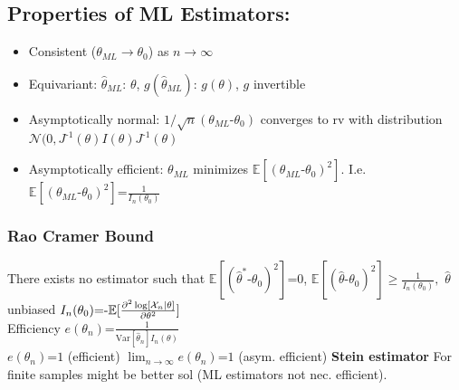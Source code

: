 \subsection{Properties of ML Estimators:}
\begin{itemize}
	\item Consistent ($\theta_{ML} \to \theta_0$) as $n\to \infty$
	\item Equivariant: $\hat\theta_{ML}$: $\theta$, $g(\hat\theta_{ML})$: $g(\theta)$, $g$ invertible
	\item Asymptotically normal: $1/\sqrt n (\theta_{ML} \text{-} \theta_0)$ converges to rv with distribution $\mathcal N(0, J^{\text{-}1}(\theta)I(\theta)J^{\text{-}1}(\theta)$
	\item Asymptotically efficient: $\theta_{ML}$ minimizes $\mathbb E[(\theta_{ML} \text{-} \theta_0)^2]$. I.e. $\mathbb E[(\theta_{ML} \text{-} \theta_0)^2] \text{=} \frac{1}{I_n(\theta_0)}$ 
\end{itemize}

\subsubsection{Rao Cramer Bound}
There exists no estimator such that $\mathbb E[(\hat\theta^* \text{-} \theta_0)^2] \text{=} 0$, 
	$  
		\mathbb E[(\hat\theta \text{-} \theta_0)^2] \geq \frac{1}{I_n(\theta_0)} ,
	$
	 $\hat\theta$ unbiased
	$I_n(\theta_0) \text{=} \text{-}\mathbb E[\frac{\partial^2\log[\mathcal X_n|\theta]}{\partial\theta^2} ]$ \\
	Efficiency $e(\theta_n) \text{=} \frac{1}{\text{Var}[\hat\theta_n] I_n(\theta)}$ \\
	$e(\theta_n) \text{=} 1$ (efficient) 
	$\lim_{n\to\infty} e(\theta_n) \text{=} 1$ (asym. efficient)
\sepline
\textbf{Stein estimator}
For finite samples might be better sol (ML estimators not nec. efficient).